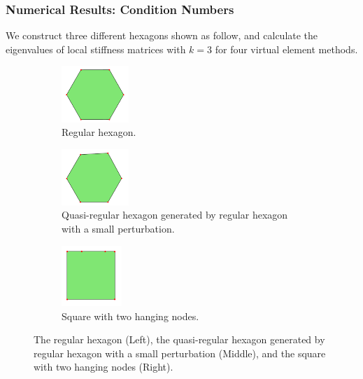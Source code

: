 \documentclass[notheorems,serif]{beamer}
\begin{document}
\begin{CJK}{UTF8}{gkai}
\begin{frame}
    \frametitle{Numerical Results: Condition Numbers}
We construct three different hexagons shown as follow, and calculate the
eigenvalues of local stiffness matrices with $k=3$ for four virtual element
methods. 
\begin{figure}[htbp]
\centering
\begin{subfigure}[t]{0.3\linewidth}
    \centering
    \includegraphics[width=1in]{../figures/stabfree/hexagon0.pdf}
    \caption{Regular hexagon.}
    \label{fig:hexagon0}
\end{subfigure}%
\hspace{0.5cm} %
\begin{subfigure}[t]{0.3\linewidth}
    \centering
    \includegraphics[width=1in]{../figures/stabfree/hexagon1.pdf}
    \caption{Quasi-regular hexagon generated by regular hexagon with a small perturbation.}
    \label{fig:hexagon1}
\end{subfigure}%
\hspace{0.5cm} %
\begin{subfigure}[t]{0.3\linewidth}
    \centering
    \includegraphics[width=0.9in]{../figures/stabfree/hexagon2.pdf}
    \caption{Square with two hanging nodes.}
    \label{fig:hexagon2}
\end{subfigure}
\caption{The regular hexagon (Left), the quasi-regular hexagon generated by regular hexagon with a small perturbation (Middle), and the square with two hanging nodes (Right).}
\label{fig:all}
\end{figure}
\end{frame}


\end{CJK}
\end{document}
